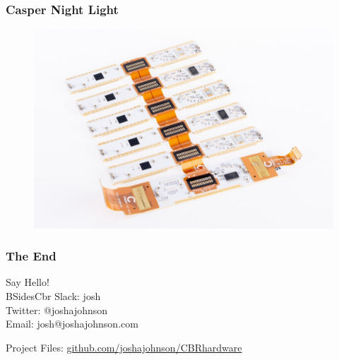 \documentclass[t]{beamer}
\begin{document}
\begin{frame}[t]
\frametitle{Casper Night Light}
\begin{figure}
	\includegraphics[height=0.75\textheight]{casper2.jpeg}
\end{figure}

\end{frame}


\begin{frame}
\frametitle{The End}

Say Hello! \\
BSidesCbr Slack: josh\\
Twitter: @\textunderscore joshajohnson\\
Email: josh@joshajohnson.com\\
\vspace{4mm}

Project Files: \url{github.com/joshajohnson/CBRhardware}\\
\end{frame}
\end{document}
